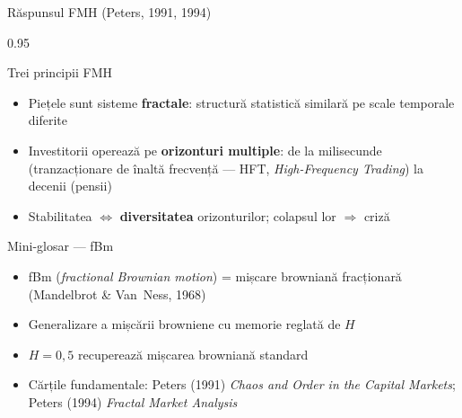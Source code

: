 \documentclass[9pt, aspectratio=169, t]{beamer}
\begin{document}
\begin{frame}[shrink=15]{Răspunsul FMH (Peters, 1991, 1994)}
\begin{cminipage}{0.95\textwidth}
\begin{block}{Trei principii FMH}
\begin{itemize}\setlength{\itemsep}{2pt}
    \item Piețele sunt sisteme \textbf{fractale}: structură statistică similară pe scale temporale diferite
    \item Investitorii operează pe \textbf{orizonturi multiple}: de la milisecunde (tranzacționare de înaltă frecvență --- HFT, \textit{High-Frequency Trading}) la decenii (pensii)
    \item Stabilitatea $\Leftrightarrow$ \textbf{diversitatea} orizonturilor; colapsul lor $\Rightarrow$ criză
\end{itemize}
\end{block}
\begin{exampleblock}{Mini-glosar --- fBm}
\begin{itemize}\setlength{\itemsep}{0pt}
    \item fBm (\textit{fractional Brownian motion}) = mișcare browniană fracționară (Mandelbrot \& Van~Ness, 1968)
    \item Generalizare a mișcării browniene cu memorie reglată de $H$
    \item $H=0{,}5$ recuperează mișcarea browniană standard
\end{itemize}
\end{exampleblock}
\begin{itemize}\setlength{\itemsep}{0pt}
    \item Cărțile fundamentale: Peters (1991) \textit{Chaos and Order in the Capital Markets}; Peters (1994) \textit{Fractal Market Analysis}
\end{itemize}
\end{cminipage}
\end{frame}
\end{document}
